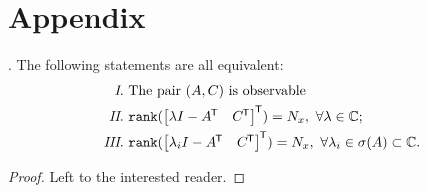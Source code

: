 \chapter{Appendix} \label{sec: Appendix}

\lipsum[1-2]

\begin{boxedlemma}{\cite{Hautus1970}.} \label{def: Lemma_1}
	The following statements are all equivalent: 
	\begin{subequations} \begin{align}
		\text{\emph{ I}. }& \text{The pair $(A, C)$ is observable} \\
		\text{\emph{ II}. }&\texttt{rank}(\begin{bmatrix} \lambda I - A^{{\mkern-1.5mu\mathsf{T}}}  & C^{{\mkern-1.5mu\mathsf{T}}} \end{bmatrix}^{{\mkern-1.5mu\mathsf{T}}} ) = N_x,  \text{ } \forall \lambda \in \mathbb{C}; \\
		\text{\emph{ III}. }&\texttt{rank}(\begin{bmatrix} \lambda_i I - A^{{\mkern-1.5mu\mathsf{T}}}  &  C^{{\mkern-1.5mu\mathsf{T}}} \end{bmatrix}^{{\mkern-1.5mu\mathsf{T}}}) = N_x, \text{ } \forall \lambda_i \in \sigma(A) \subset \mathbb{C}.
	\end{align}	\end{subequations}
\end{boxedlemma}

\begin{proof}
	Left to the interested reader.
\end{proof}

\lipsum[1][1-6]